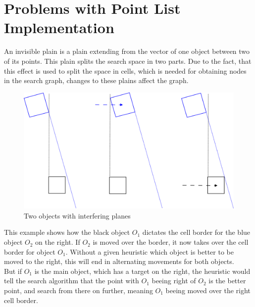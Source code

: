 \section{Problems with Point List Implementation}
An invisible plain is a plain extending from the vector of one object between two of its points. This plain splits the search space in two parts. Due to the fact, that this effect is used to split the space in cells, which is needed for obtaining nodes in the search graph, changes to these plains affect the graph.\\
\begin{figure}[H]
\centering
\includegraphics[scale=0.3]{ghostplanes}
\caption{Two objects with interfering planes}
\end{figure}
 This example shows how the black object $O_1$ dictates the cell border for the blue object $O_2$ on the right. If $O_2$ is moved over the border, it now takes over the cell border for object  $O_1$. Without a given heuristic which object is better to be moved to the right, this will end in alternating movements for both objects.\\
But if  $O_1$ is the main object, which has a target on the right, the heuristic would tell the search algorithm that the point with $O_1$ beeing right of  $O_2$ is the better point, and search from there on further, meaning $O_1$ beeing moved over the right cell border.

